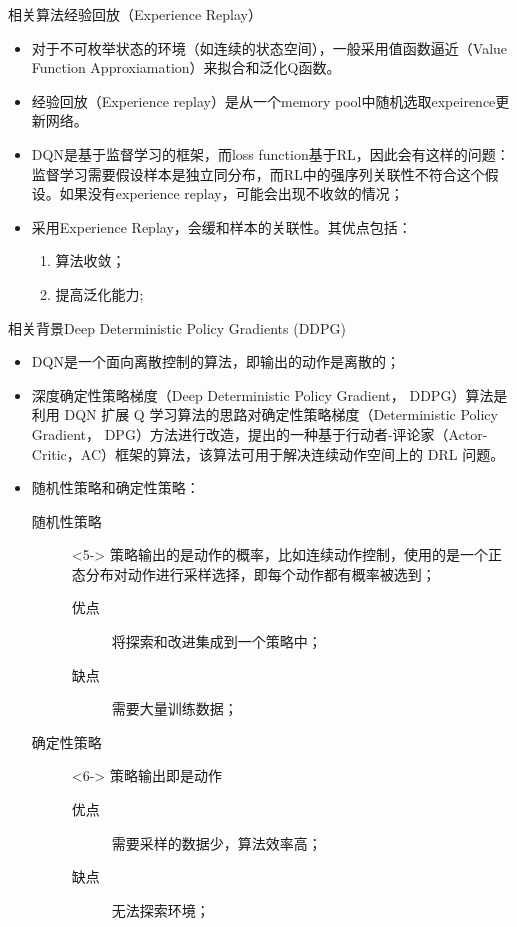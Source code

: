\documentclass[10pt]{beamer}
\begin{document}
	\begin{frame}{相关算法}{经验回放（Experience Replay）}
		\begin{itemize}
			\item 对于不可枚举状态的环境（如连续的状态空间），一般采用值函数逼近（Value Function Approxiamation）来拟合和泛化Q函数。
			
			\item 经验回放（Experience replay）是从一个memory pool中随机选取expeirence更新网络。
			
			\item DQN是基于监督学习的框架，而loss function基于RL，因此会有这样的问题：监督学习需要假设样本是独立同分布，而RL中的强序列关联性不符合这个假设。如果没有experience replay，可能会出现不收敛的情况；
			
			\item 采用Experience Replay，会缓和样本的关联性。其优点包括：
				\begin{enumerate}
					\item 算法收敛；
					\item 提高泛化能力;
				\end{enumerate}
			
		\end{itemize}
	\end{frame}

	\begin{frame}{相关背景}{Deep Deterministic Policy Gradients (DDPG)}
		\begin{itemize}
			\item<2-> DQN是一个面向离散控制的算法，即输出的动作是离散的；
			
			\item<3-> 深度确定性策略梯度（Deep Deterministic Policy Gradient， DDPG）算法是利用 DQN 扩展 Q 学习算法的思路对确定性策略梯度（Deterministic Policy Gradient， DPG）方法进行改造，提出的一种基于行动者-评论家（Actor-Critic，AC）框架的算法，该算法可用于解决连续动作空间上的 DRL 问题。
			
			\item<4-> 随机性策略和确定性策略：
				\begin{description}
					\item[随机性策略]<5-> 策略输出的是动作的概率，比如连续动作控制，使用的是一个正态分布对动作进行采样选择，即每个动作都有概率被选到；
						\begin{description}
							\item[优点] 将探索和改进集成到一个策略中；
							\item[缺点] 需要大量训练数据；
						\end{description}
					
					\item [确定性策略]<6-> 策略输出即是动作
						\begin{description}
							\item[优点] 需要采样的数据少，算法效率高；
							\item[缺点] 无法探索环境；
						\end{description}
				\end{description}
			
		\end{itemize}
	\end{frame}
	
\end{document}
